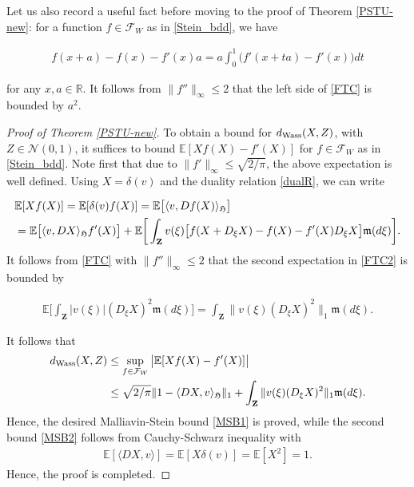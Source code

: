 \documentclass[letterpaper, 11pt,  reqno]{amsart}
\newcommand{\noi}{\noindent}
\newcommand{\R}{\mathbb{R}}
\newcommand{\E}{\mathbb{E}}
\newcommand{\F}{\mathcal{F}}
\newcommand{\cN}{\mathcal{N}}
\newcommand{\dl}{\delta}
\newcommand{\jb}[1]
{\langle #1 \rangle}
\newcommand{\fm}{\mathfrak{m}}
\newcommand{\fH}{\mathfrak{H}}
\numberwithin{equation}{section}
\numberwithin{theorem}{section}
\begin{document}
 
Let us also record a useful fact before moving to the proof of Theorem \ref{PSTU-new}:
for a function $f\in\F_W$ as in \eqref{Stein_bdd}, 
we have

\noi
\begin{align}\label{FTC}
f(x+a) - f(x) - f'(x) a = a \int_0^1 \big( f'(x+ t a) - f'(x) \big) dt
\end{align}

\noi
for any $x, a\in\R$. It follows from $\|f''\|_\infty \leq 2$ that the left side of \eqref{FTC} is bounded by 
$a^2$.


 

 \begin{proof}[Proof of Theorem \ref{PSTU-new}]
  To obtain a bound 
 for $d_{\rm Wass}( X, Z)$, with $Z\in\cN(0,1)$,
 it suffices to bound $\E[ X f(X) - f'(X)]$  for $f\in\F_W$ as in \eqref{Stein_bdd}.
 Note first that due to $\| f' \|_\infty \leq  \sqrt{2/\pi}$, the above expectation is well defined. 
 Using $X = \dl(v)$ and the duality relation \eqref{dualR}, we can write 
 
 \noi
 \begin{align}
& \E[ X f(X) ]
 =  \E[  \dl(v) f(X) ] = \E\big[ \langle v, Df(X) \rangle_\fH \big] \notag  \\
 &= \E\big[ \langle v, DX  \rangle_\fH  f'(X)  \big] 
 + \E\bigg[  \int_{\mathbf{Z}}  v(\xi)  \big[ f(X + D_\xi X) - f(X) - f'(X) D_\xi X         \big]  \fm(d\xi) \bigg].
 \label{FTC2}
 \end{align}
It follows from \eqref{FTC} with $\|f'' \|_\infty \leq 2$ that 
the second expectation in \eqref{FTC2} is bounded by 

\noi
\begin{align} \label{pre_coup}
\E\bigg[  \int_{\mathbf{Z}}   |v (\xi) |  ( D_\xi X   )^2     \fm(d\xi) \bigg] 
=  \int_{\mathbf{Z}}\|  v(\xi)  ( D_\xi X   )^2 \|_1     \fm(d\xi). 
\end{align}

\noi
It follows that 
\begin{align*}
d_{\rm Wass}( X, Z)
&\leq \sup_{f\in\F_W} \big| \E[ X f(X) - f'(X)]  \big| \\
&\leq  \sqrt{2/\pi} \| 1 - \jb{DX,  v  }_\fH \|_1 + 
 \int_{\mathbf{Z}}\|  v(\xi)  ( D_\xi X   )^2 \|_1     \fm(d\xi).
\end{align*}
Hence, the desired Malliavin-Stein bound  \eqref{MSB1}
is proved, while
the second bound \eqref{MSB2}
follows from Cauchy-Schwarz inequality with
\begin{align}\label{IBPv}
\E[ \jb{DX, v} ] = \E[ X\dl(v)] = \E[ X^2] = 1.
\end{align}
Hence, the proof is completed. 
\qedhere



\end{proof}
\end{document}
